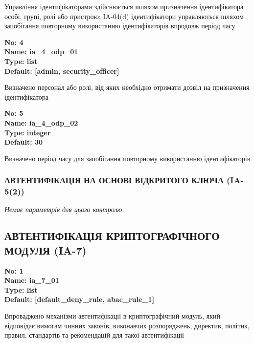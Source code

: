 \documentclass{article}
\begin{document}
{\footnotesize Управління ідентифікаторами здійснюється шляхом призначення ідентифікатора особі, групі, ролі або пристрою; IA-04(d) ідентифікатори управляються шляхом запобігання повторному використанню ідентифікаторів впродовж період часу}


{\footnotesize\bfseries
No: 4\\
Name: ia\_\allowbreak{}4\_\allowbreak{}odp\_\allowbreak{}01\\
Type: list\\
Default: [\textquotedbl{}admin\textquotedbl{}, \textquotedbl{}security\_\allowbreak{}officer\textquotedbl{}]
}

{\footnotesize Визначено персонал або ролі, від яких необхідно отримати дозвіл на призначення ідентифікатора}


{\footnotesize\bfseries
No: 5\\
Name: ia\_\allowbreak{}4\_\allowbreak{}odp\_\allowbreak{}02\\
Type: integer\\
Default: 30
}

{\footnotesize Визначено період часу для запобігання повторному використанню ідентифікаторів}




\subsubsection{АВТЕНТИФІКАЦІЯ НА ОСНОВІ ВІДКРИТОГО КЛЮЧА (IA-5(2))}


\vspace{10pt}
\textit{Немає параметрів для цього контролю.}
\vspace{10pt}


\subsection{АВТЕНТИФІКАЦІЯ КРИПТОГРАФІЧНОГО МОДУЛЯ (IA-7)}


\vspace{10pt}
{\footnotesize\bfseries
No: 1\\
Name: ia\_\allowbreak{}7\_\allowbreak{}01\\
Type: list\\
Default: [\textquotedbl{}default\_\allowbreak{}deny\_\allowbreak{}rule\textquotedbl{}, \textquotedbl{}abac\_\allowbreak{}rule\_\allowbreak{}1\textquotedbl{}]
}

{\footnotesize Впроваджено механізми автентифікації в криптографічний модуль, який відповідає вимогам чинних законів, виконавчих розпоряджень, директив, політик, правил, стандартів та рекомендацій для такої автентифікації}
\end{document}

